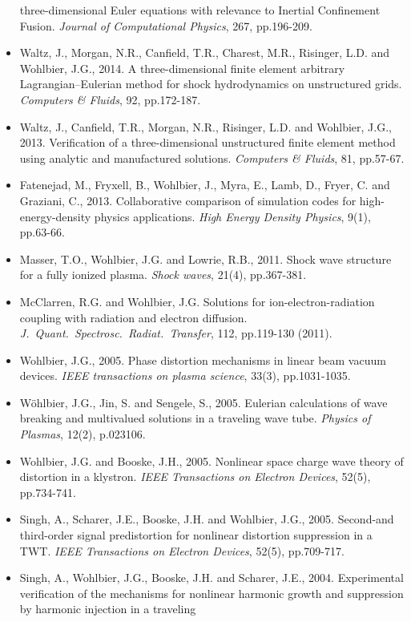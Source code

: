 \documentclass{muratcan_cv}
\begin{document}
\begin{itemize}
  three-dimensional Euler equations with relevance to Inertial
  Confinement Fusion. {\it Journal of Computational Physics}, 267,
  pp.196-209.
\item Waltz, J., Morgan, N.R., Canfield, T.R., Charest, M.R.,
  Risinger, L.D. and Wohlbier, J.G., 2014. A three-dimensional
  finite element arbitrary Lagrangian–Eulerian method for shock
  hydrodynamics on unstructured grids. {\it Computers \& Fluids}, 92,
  pp.172-187.
\item Waltz, J., Canfield, T.R., Morgan, N.R., Risinger, L.D. and
  Wohlbier, J.G., 2013. Verification of a three-dimensional
  unstructured finite element method using analytic and manufactured
  solutions. {\it Computers \& Fluids}, 81, pp.57-67.
\item Fatenejad, M., Fryxell, B., Wohlbier, J., Myra, E., Lamb, D.,
  Fryer, C. and Graziani, C., 2013. Collaborative comparison of
  simulation codes for high-energy-density physics applications. {\it High
  Energy Density Physics}, 9(1), pp.63-66.
\item Masser, T.O., Wohlbier, J.G. and Lowrie, R.B., 2011. Shock wave
  structure for a fully ionized plasma. {\it Shock waves}, 21(4),
  pp.367-381.
\item McClarren, R.G. and Wohlbier, J.G. Solutions for
  ion-electron-radiation coupling with radiation and electron
  diffusion. {\it J.~Quant.~Spectrosc.~Radiat.~Transfer}, 112, pp.119-130
  (2011).
\item Wohlbier, J.G., 2005. Phase distortion mechanisms in linear beam
  vacuum devices. {\it IEEE transactions on plasma science}, 33(3),
  pp.1031-1035.
\item Wöhlbier, J.G., Jin, S. and Sengele, S., 2005. Eulerian
  calculations of wave breaking and multivalued solutions in a
  traveling wave tube. {\it Physics of Plasmas}, 12(2), p.023106.
\item Wohlbier, J.G. and Booske, J.H., 2005. Nonlinear space charge
  wave theory of distortion in a klystron. {\it IEEE Transactions on
  Electron Devices}, 52(5), pp.734-741.
\item Singh, A., Scharer, J.E., Booske, J.H. and Wohlbier, J.G.,
  2005. Second-and third-order signal predistortion for nonlinear
  distortion suppression in a TWT. {\it IEEE Transactions on Electron
  Devices}, 52(5), pp.709-717.
\item Singh, A., Wohlbier, J.G., Booske, J.H. and Scharer, J.E.,
  2004. Experimental verification of the mechanisms for nonlinear
  harmonic growth and suppression by harmonic injection in a traveling

\end{itemize}
\end{document}

